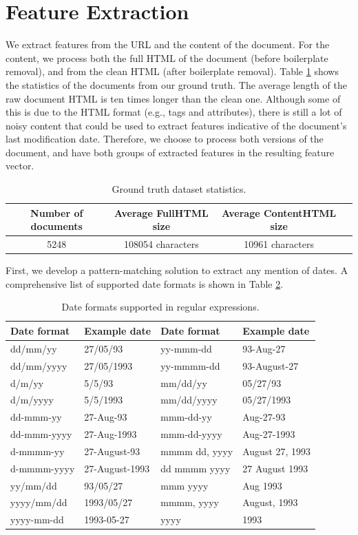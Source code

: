 \section{Feature Extraction}
We extract features from the URL and the content of the document. For the content, we process both the full HTML of the document (before boilerplate removal), and from the clean HTML (after boilerplate removal). Table \ref{tb:dataset-doc} shows the statistics of the documents from our ground truth. The average length of the raw document HTML is ten times longer than the clean one. Although some of this is due to the HTML format (e.g., tags and attributes), there is still a lot of noisy content that could be used to extract features indicative of the document's last modification date. Therefore, we choose to process both versions of the document, and have both groups of extracted features in the resulting feature vector.

\begin{table}[h!]
\centering
\caption{Ground truth dataset statistics.}
\label{tb:dataset-doc}
\begin{tabular}{@{}cccc@{}}
\toprule
Number of documents & Average FullHTML size & Average ContentHTML size &  \\ \midrule
5248 & 108054 characters & 10961 characters &  \\ \bottomrule
\end{tabular}
\end{table}

First, we develop a pattern-matching solution to extract any mention of dates. A comprehensive list of supported date formats is shown in Table \ref{tb:dates}.

\begin{table}[!htbp]
\centering
\caption{Date formats supported in regular expressions.}
\label{tb:dates}
\begin{tabular}{@{}ll|ll@{}}
\toprule
Date format & Example date & Date format & Example date \\ \midrule
dd/mm/yy & 27/05/93 & yy-mmm-dd & 93-Aug-27 \\
dd/mm/yyyy & 27/05/1993 & yy-mmmm-dd & 93-August-27 \\
d/m/yy & 5/5/93 & mm/dd/yy & 05/27/93 \\
d/m/yyyy & 5/5/1993 & mm/dd/yyyy & 05/27/1993 \\
dd-mmm-yy & 27-Aug-93 & mmm-dd-yy & Aug-27-93 \\
dd-mmm-yyyy & 27-Aug-1993 & mmm-dd-yyyy & Aug-27-1993 \\
d-mmmm-yy & 27-August-93 & mmmm dd, yyyy & August 27, 1993 \\
d-mmmm-yyyy & 27-August-1993 & dd mmmm yyyy & 27 August 1993 \\
yy/mm/dd & 93/05/27 & mmm yyyy & Aug 1993 \\
yyyy/mm/dd & 1993/05/27 & mmmm, yyyy & August, 1993 \\
yyyy-mm-dd & 1993-05-27 & yyyy & 1993 \\ \bottomrule
\end{tabular}
\end{table}

